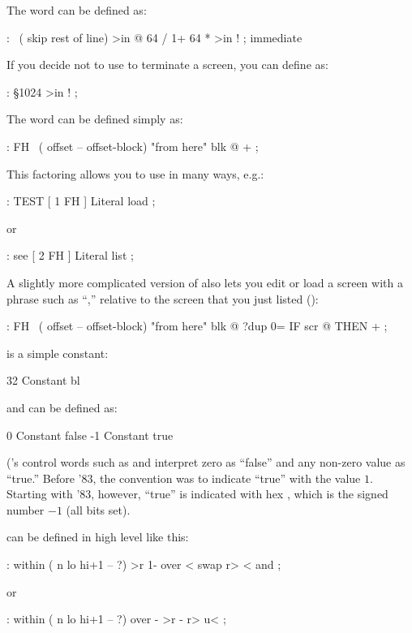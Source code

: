 The word \forthb{\bs} can be defined as:
\begin{Code}
: \  ( skip rest of line)
     >in @  64 / 1+  64 *  >in ! ; immediate
\end{Code}
If you decide not to use  to terminate a screen, you can
define  as:
\begin{Code}
: \S   1024 >in ! ;
\end{Code}
%
The word  can be defined simply as:
\begin{Code}
: FH   \   ( offset -- offset-block)   "from here"
    blk @ + ;
\end{Code}
This factoring allows you to use  in many ways, e.g.:
\begin{Code}
: TEST   [ 1 FH ] Literal load ;
\end{Code}
or
\begin{Code}
: see   [ 2 FH ] Literal list ;
\end{Code}
A slightly more complicated version of  also lets you edit or
load a screen with a phrase such as ``,'' relative to
the screen that you just listed ():
\begin{Code}
: FH   \   ( offset -- offset-block)   "from here"
     blk @  ?dup 0= IF  scr @  THEN  + ;
\end{Code}
 is a simple constant:
\begin{Code}
32 Constant bl
\end{Code}
 and 
can be defined as:
\begin{Code}
0 Constant false
-1 Constant true
\end{Code}
(\Forth{}'s control words such as  and  interpret
zero as ``false'' and any non-zero value as ``true.''  Before \Forth{}
'83, the convention was to indicate ``true'' with the value $1$.  Starting
with \Forth{} '83, however, ``true'' is indicated with hex ,
which is the signed number $-1$ (all bits set).

 can be defined in high level like this:
\begin{Code}
: within  ( n lo hi+1 -- ?)
     >r  1- over <  swap r>  < and ;
\end{Code}
or
\begin{Code}
: within ( n lo hi+1 -- ?)
   over -  >r - r> u< ;
\end{Code}


